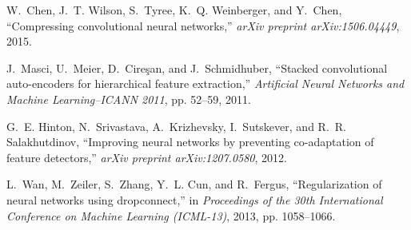 \documentclass[conference]{IEEEtran}
\begin{document}
\begin{thebibliography}{10}
W.~Chen, J.~T. Wilson, S.~Tyree, K.~Q. Weinberger, and Y.~Chen, ``Compressing
convolutional neural networks,'' \emph{arXiv preprint arXiv:1506.04449},
2015.

J.~Masci, U.~Meier, D.~Cire{\c{s}}an, and J.~Schmidhuber, ``Stacked
convolutional auto-encoders for hierarchical feature extraction,''
\emph{Artificial Neural Networks and Machine Learning--ICANN 2011}, pp.
52--59, 2011.

G.~E. Hinton, N.~Srivastava, A.~Krizhevsky, I.~Sutskever, and R.~R.
Salakhutdinov, ``Improving neural networks by preventing co-adaptation of
feature detectors,'' \emph{arXiv preprint arXiv:1207.0580}, 2012.

L.~Wan, M.~Zeiler, S.~Zhang, Y.~L. Cun, and R.~Fergus, ``Regularization of
neural networks using dropconnect,'' in \emph{Proceedings of the 30th
International Conference on Machine Learning (ICML-13)}, 2013, pp.
1058--1066.

\end{thebibliography}



\end{document}
